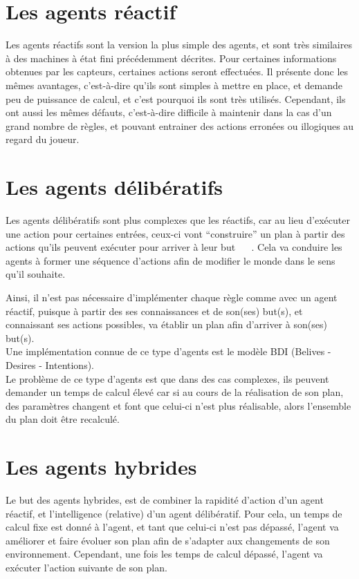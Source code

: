 \documentclass[asi]{picINSAIA}
\begin{document}
\section{Les agents réactif}
Les agents réactifs sont la version la plus simple des agents, et sont très similaires à des machines à état fini précédemment décrites. Pour certaines informations obtenues par les capteurs, certaines actions seront effectuées. Il présente donc les mêmes avantages, c'est-à-dire qu'ils sont simples à mettre en place, et demande peu de puissance de calcul, et c'est pourquoi ils sont très utilisés.
Cependant, ils ont aussi les mêmes défauts, c'est-à-dire difficile à maintenir dans la cas d'un grand nombre de règles, et pouvant entrainer des actions erronées ou illogiques au regard du joueur.

\section{Les agents délibératifs}
Les agents délibératifs sont plus complexes que les réactifs, car au lieu d'exécuter une action pour certaines entrées, ceux-ci vont ``construire'' un plan à partir des actions qu'ils peuvent exécuter pour arriver à leur but ~\cite{IntelAgents4CompGames} ~\cite{IntelAgentsInCompGames}. Cela va conduire les agents à former une séquence d'actions afin de modifier le monde dans le sens qu'il souhaite.

Ainsi, il n'est pas nécessaire d'implémenter chaque règle comme avec un agent réactif, puisque à partir des ses connaissances et de son(ses) but(s), et connaissant ses actions possibles, va établir un plan afin d'arriver à son(ses) but(s).\\
Une implémentation connue de ce type d'agents est le modèle BDI (Belives - Desires - Intentions).\\
Le problème de ce type d'agents est que dans des cas complexes, ils peuvent demander un temps de calcul élevé car si au cours de la réalisation de son plan, des paramètres changent et font que celui-ci n'est plus réalisable, alors l'ensemble du plan doit être recalculé.

\section{Les agents hybrides}
Le but des agents hybrides, est de combiner la rapidité d'action d'un agent réactif, et l'intelligence (relative) d'un agent délibératif.
Pour cela, un temps de calcul fixe est donné à l'agent, et tant que celui-ci n'est pas dépassé, l'agent va améliorer et faire évoluer son plan afin de s'adapter aux changements de son environnement. Cependant, une fois les temps de calcul dépassé, l'agent va exécuter l'action suivante de son plan.
\end{document}
